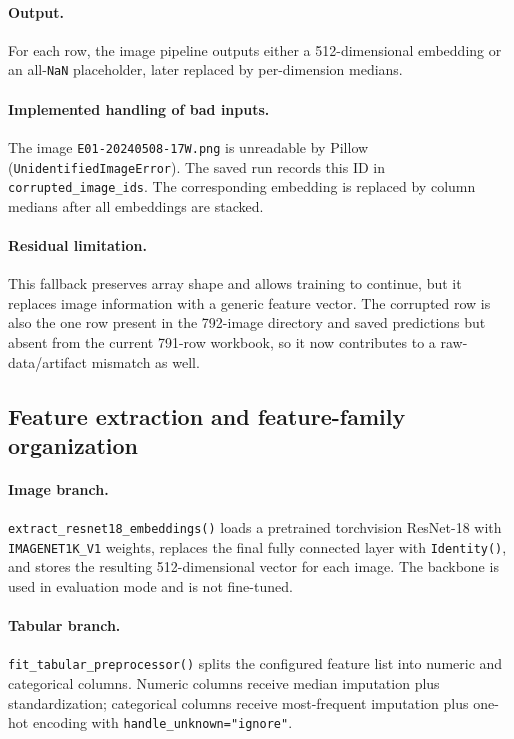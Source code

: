 \documentclass[11pt]{article}
\begin{document}
\paragraph{Output.}
For each row, the image pipeline outputs either a 512-dimensional embedding or an all-\texttt{NaN} placeholder, later replaced by per-dimension medians.

\paragraph{Implemented handling of bad inputs.}
The image \texttt{E01-20240508-17W.png} is unreadable by Pillow (\texttt{UnidentifiedImageError}). The saved run records this ID in \texttt{corrupted\_image\_ids}. The corresponding embedding is replaced by column medians after all embeddings are stacked.

\paragraph{Residual limitation.}
This fallback preserves array shape and allows training to continue, but it replaces image information with a generic feature vector. The corrupted row is also the one row present in the 792-image directory and saved predictions but absent from the current 791-row workbook, so it now contributes to a raw-data/artifact mismatch as well.

\subsection{Feature extraction and feature-family organization}
\paragraph{Image branch.}
\texttt{extract\_resnet18\_embeddings()} loads a pretrained torchvision ResNet-18 with \texttt{IMAGENET1K\_V1} weights, replaces the final fully connected layer with \texttt{Identity()}, and stores the resulting 512-dimensional vector for each image. The backbone is used in evaluation mode and is not fine-tuned.

\paragraph{Tabular branch.}
\texttt{fit\_tabular\_preprocessor()} splits the configured feature list into numeric and categorical columns. Numeric columns receive median imputation plus standardization; categorical columns receive most-frequent imputation plus one-hot encoding with \texttt{handle\_unknown="ignore"}.
\end{document}
